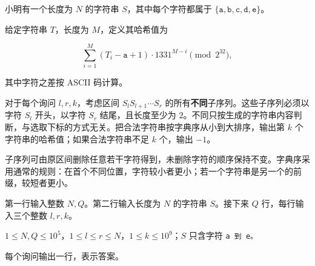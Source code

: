 \Legend
小明有一个长度为 $N$ 的字符串 $S$，其中每个字符都属于 $\{\texttt{a},\texttt{b},\texttt{c},\texttt{d},\texttt{e}\}$。

给定字符串 $T$，长度为 $M$，定义其哈希值为

$$\sum_{i=1}^{M}(T_i-\texttt{a}+1)\cdot1331^{M-i}\pmod{2^{32}},$$

其中字符之差按 ASCII 码计算。

对于每个询问 $l,r,k$，考虑区间 $S_lS_{l+1}\cdots S_r$ 的所有\textbf{不同}子序列。这些子序列必须以字符 $S_l$ 开头，以字符 $S_r$ 结尾，且长度至少为 $2$。不同只按生成的字符串内容判断，与选取下标的方式无关。把合法字符串按字典序从小到大排序，输出第 $k$ 个字符串的哈希值；如果合法字符串不足 $k$ 个，输出 $-1$。

子序列可由原区间删除任意若干字符得到，未删除字符的顺序保持不变。字典序采用通常的规则：在首个不同位置，字符较小者更小；若一个字符串是另一个的前缀，较短者更小。

\Input

第一行输入整数 $N,Q$。第二行输入长度为 $N$ 的字符串 $S$。接下来 $Q$ 行，每行输入三个整数 $l,r,k$。

$1\le N,Q\le10^5$，$1\le l\le r\le N$，$1\le k\le10^9$；$S$ 只含字符 \tt{a} 到 \tt{e}。

\Output

每个询问输出一行，表示答案。

\Examples

\begin{example}
\end{example}

\begin{example}
\end{example}
